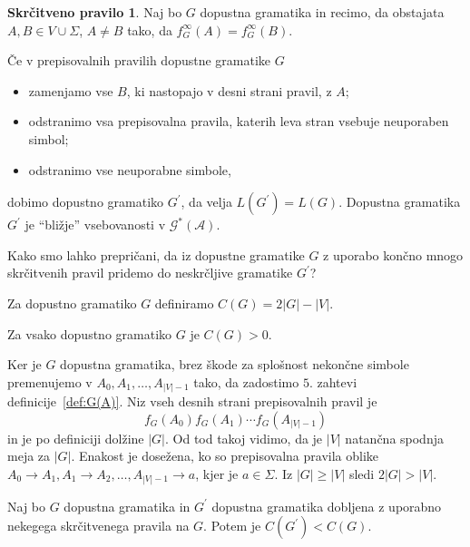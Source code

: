 \documentclass[fin1, tisk]{fmfdelo}
\providecommand{\abs}[1]{\left\lvert #1 \right\rvert}
\newcommand{\A}{\mathcal{A}}
\newcommand{\G}{\mathcal{G}}
\theoremstyle{definition}
\newtheorem{pravilo}{Skrčitveno pravilo}
\begin{document}
\begin{pravilo}
    Naj bo $G$ dopustna gramatika in recimo, da obstajata $A,B \in V \cup \Sigma$, $A \neq B$ tako,
    da $f^\infty_G(A) = f^\infty_G(B)$.

    Če v prepisovalnih pravilih dopustne gramatike $G$
    \begin{itemize}
        \item zamenjamo vse $B$, ki nastopajo v desni strani pravil, z $A$;
        \item odstranimo vsa prepisovalna pravila, katerih leva stran vsebuje neuporaben simbol;
        \item odstranimo vse neuporabne simbole,
    \end{itemize}
    dobimo dopustno gramatiko $G^\prime$, da velja $L(G^\prime) = L(G)$. Dopustna gramatika 
    $G^\prime$ je ``bližje'' vsebovanosti v $\G^*(\A)$.
\end{pravilo}

Kako smo lahko prepričani, da iz dopustne gramatike $G$ z uporabo končno mnogo skrčitvenih
pravil pridemo do neskrčljive gramatike $G^\prime$?

\begin{definicija}
    Za dopustno gramatiko $G$ definiramo $C(G) = 2 \abs{G} - \abs{V}$.
\end{definicija}

\begin{trditev}\label{trditev:C}
    Za vsako dopustno gramatiko $G$ je $C(G) > 0$.
\end{trditev}

\begin{dokaz}
    Ker je $G$ dopustna gramatika, brez škode za splošnost nekončne simbole premenujemo v 
    $A_0, A_1, \ldots, A_{\abs{V}-1}$ tako, da zadostimo $5.$ zahtevi definicije~\ref{def:G(A)}.
    Niz vseh desnih strani prepisovalnih pravil je
    \[
        f_G(A_0)f_G(A_1) \cdots f_G(A_{\abs{V}-1})
    \]
    in je po definiciji dolžine $\abs{G}$.
    Od tod takoj vidimo, da je $\abs{V}$ natančna spodnja meja za $\abs{G}$. Enakost je dosežena,
    ko so prepisovalna pravila oblike 
    $ A_0 \rightarrow A_1, A_1 \rightarrow A_2, \ldots, A_{\abs{V}-1} \rightarrow a$,
    kjer je $a \in \Sigma$.
    Iz $\abs{G} \geq \abs{V}$ sledi $2 \abs{G} > \abs{V}$.
\end{dokaz}

\begin{trditev}\label{trditev:Skrčitev}
    Naj bo $G$ dopustna gramatika in $G^\prime$ dopustna gramatika dobljena z uporabno nekegega
    skrčitvenega pravila na $G$. Potem je $C(G^\prime) < C(G)$. 
\end{trditev}
\end{document}
